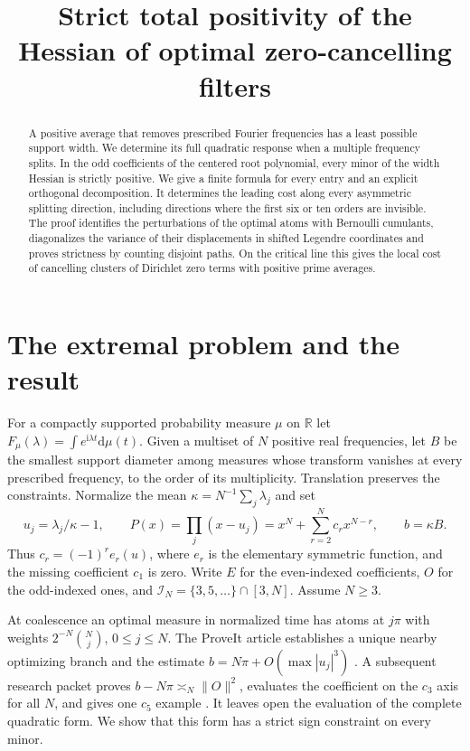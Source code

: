 \documentclass[11pt]{article}
\title{Strict total positivity of the Hessian of optimal zero-cancelling filters}
\author{}\date{}
\newcommand{\ii}{\mathrm i}
\newcommand{\dd}{\mathrm d}
\newcommand{\ind}{\mathcal I_N}
\begin{document}
\maketitle
\begin{abstract}
A positive average that removes prescribed Fourier frequencies has a least
possible support width. We determine its full quadratic response when a
multiple frequency splits. In the odd coefficients of the centered root
polynomial, every minor of the width Hessian is strictly positive.
We give a finite formula for every entry and an explicit orthogonal
decomposition. It determines the leading cost along every asymmetric
splitting direction, including directions where the first six or ten
orders are invisible. The proof identifies the perturbations of the
optimal atoms with Bernoulli cumulants, diagonalizes the variance of their
displacements in shifted Legendre coordinates and proves strictness by
counting disjoint paths. On the critical line this gives the local cost
of cancelling clusters of Dirichlet zero terms with positive prime averages.
\end{abstract}

\section{The extremal problem and the result}
For a compactly supported probability measure $\mu$ on $\mathbb R$ let
$F_\mu(\lambda)=\int e^{\ii\lambda t}\dd\mu(t)$. Given a multiset of $N$
positive real frequencies, let $B$ be the smallest support diameter among
measures whose transform vanishes at every prescribed frequency, to the
order of its multiplicity. Translation preserves the constraints.
Normalize the mean $\kappa=N^{-1}\sum_j\lambda_j$ and set
\[
 u_j=\lambda_j/\kappa-1,\qquad
 P(x)=\prod_j(x-u_j)=x^N+\sum_{r=2}^Nc_rx^{N-r},
 \qquad b=\kappa B .
\]
Thus $c_r=(-1)^r e_r(u)$, where $e_r$ is the elementary symmetric
function, and the missing coefficient $c_1$ is zero. Write $E$ for the
even-indexed coefficients, $O$ for the odd-indexed ones, and
$\ind=\{3,5,\ldots\}\cap[3,N]$. Assume $N\ge3$.

At coalescence an optimal measure in normalized time has atoms at
$j\pi$ with weights $2^{-N}\binom Nj$, $0\le j\le N$. The ProveIt
article establishes a unique nearby optimizing branch and the estimate
$b=N\pi+O(\max|u_j|^3)$ \cite{repo}. A subsequent research packet
proves $b-N\pi\asymp_N\|O\|^2$, evaluates the coefficient on the
$c_3$ axis for all $N$, and gives one $c_5$ example \cite{previous}.
It leaves open the evaluation of the complete quadratic form. We
show that this form has a strict sign constraint on every minor.
\end{document}
